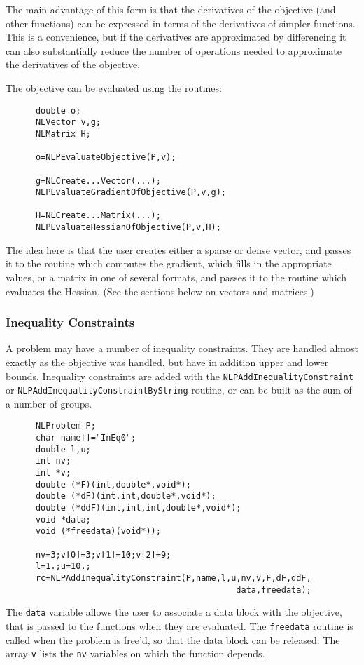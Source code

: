 \documentclass[12pt]{article}
\begin{document}
     The main advantage of this form is that the derivatives of the objective (and other functions) can be
     expressed in terms of the derivatives of simpler functions. This is a convenience, but if the derivatives
     are approximated by differencing it can also substantially reduce the number of operations needed to approximate
     the derivatives of the objective.

     The objective can be evaluated using the routines:
     \begin{verbatim}
      double o;
      NLVector v,g;
      NLMatrix H;

      o=NLPEvaluateObjective(P,v);

      g=NLCreate...Vector(...);
      NLPEvaluateGradientOfObjective(P,v,g);

      H=NLCreate...Matrix(...);
      NLPEvaluateHessianOfObjective(P,v,H);
     \end{verbatim}
     The idea here is that the user creates either a sparse or dense vector, and passes it to the routine
     which computes the gradient, which fills in the appropriate values, or a matrix in one of several 
     formats, and passes it to the routine which evaluates the Hessian. (See the sections below on vectors
     and matrices.)

   \subsubsection{Inequality Constraints}

     A problem may have a number of inequality constraints. They are handled almost exactly as the objective was handled,
     but have in addition upper and lower bounds. Inequality constraints are added with the {\tt NLPAdd\-Inequality\-Constraint}
     or {\tt NLPAdd\-Inequality\-Constraint\-ByString} routine, or can be built as the sum of a number of groups.
     \begin{verbatim}
      NLProblem P;
      char name[]="InEq0";
      double l,u;
      int nv;
      int *v;
      double (*F)(int,double*,void*);
      double (*dF)(int,int,double*,void*);
      double (*ddF)(int,int,int,double*,void*);
      void *data;
      void (*freedata)(void*));

      nv=3;v[0]=3;v[1]=10;v[2]=9;
      l=1.;u=10.;
      rc=NLPAddInequalityConstraint(P,name,l,u,nv,v,F,dF,ddF,
                                              data,freedata);
     \end{verbatim}
     The {\tt data} variable allows the user to associate a data block with the objective, that is passed to the
     functions when they are evaluated. The {\tt freedata} routine is called when the problem is free'd, so that
     the data block can be released. The array {\tt v} lists the {\tt nv} variables on which the function depends.
\end{document}
